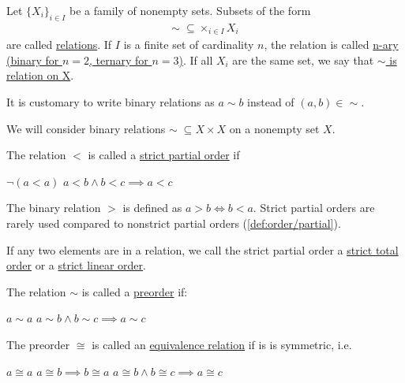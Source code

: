 \begin{definition}\label{def:relations}
  Let $\{ X_i \}_{i \in I}$ be a family of nonempty sets.
  Subsets of the form
  \begin{align*}
    \sim\; \subseteq \times_{i \in I} X_i
  \end{align*}
  are called \uline{relations}. If $I$ is a finite set of cardinality $n$, the relation is called \uline{n-ary (binary for $n = 2$, ternary for $n = 3$)}. If all $X_i$ are the same set, we say that \uline{$\sim$ is relation on X}.

  It is customary to write binary relations as $a \sim b$ instead of $(a, b) \in \sim$.
\end{definition}

\begin{definition}\label{def:orders}
  We will consider binary relations $\sim\; \subseteq X \times X$ on a nonempty set $X$.

  \begin{defenum}
    \item\label{def:order/strict_partial} The relation $<$ is called a \uline{strict partial order} if
    \begin{description}
       $\lnot(a < a)$
       $a < b \land b < c \implies a < c$
    \end{description}

    The binary relation $>$ is defined as $a > b \iff b < a$. Strict partial orders are rarely used compared to nonstrict partial orders (\cref{def:order/partial}).

    If any two elements are in a relation, we call the strict partial order a \uline{strict total order} or a \uline{strict linear order}.

    \item\label{def:order/preorder} The relation $\sim$ is called a \uline{preorder} if:
    \begin{description}
       $a \sim a$
       $a \sim b \land b \sim c \implies a \sim c$
    \end{description}

    \item\label{def:order/equivalence} The preorder $\cong$ is called an \uline{equivalence relation} if is is symmetric, i.e.
    \begin{description}
       $a \cong a$
       $a \cong b \implies b \cong a$
       $a \cong b \land b \cong c \implies a \cong c$
    \end{description}


\end{defenum}
\end{definition}
